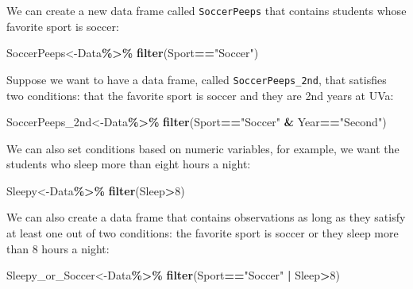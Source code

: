 \documentclass[
]{book}
\newenvironment{Shaded}{\begin{snugshade}}{\end{snugshade}}
\newcommand{\DecValTok}[1]{\textcolor[rgb]{0.00,0.00,0.81}{#1}}
\newcommand{\FunctionTok}[1]{\textcolor[rgb]{0.13,0.29,0.53}{\textbf{#1}}}
\newcommand{\NormalTok}[1]{#1}
\newcommand{\OtherTok}[1]{\textcolor[rgb]{0.56,0.35,0.01}{#1}}
\newcommand{\SpecialCharTok}[1]{\textcolor[rgb]{0.81,0.36,0.00}{\textbf{#1}}}
\newcommand{\StringTok}[1]{\textcolor[rgb]{0.31,0.60,0.02}{#1}}
\begin{document}
We can create a new data frame called \texttt{SoccerPeeps} that contains students whose favorite sport is soccer:

\begin{Shaded}
\begin{Highlighting}[]
\NormalTok{SoccerPeeps}\OtherTok{\textless{}{-}}\NormalTok{Data}\SpecialCharTok{\%\textgreater{}\%}
  \FunctionTok{filter}\NormalTok{(Sport}\SpecialCharTok{==}\StringTok{"Soccer"}\NormalTok{)}
\end{Highlighting}
\end{Shaded}

Suppose we want to have a data frame, called \texttt{SoccerPeeps\_2nd}, that satisfies two conditions: that the favorite sport is soccer and they are 2nd years at UVa:

\begin{Shaded}
\begin{Highlighting}[]
\NormalTok{SoccerPeeps\_2nd}\OtherTok{\textless{}{-}}\NormalTok{Data}\SpecialCharTok{\%\textgreater{}\%}
  \FunctionTok{filter}\NormalTok{(Sport}\SpecialCharTok{==}\StringTok{"Soccer"} \SpecialCharTok{\&}\NormalTok{ Year}\SpecialCharTok{==}\StringTok{"Second"}\NormalTok{)}
\end{Highlighting}
\end{Shaded}

We can also set conditions based on numeric variables, for example, we want the students who sleep more than eight hours a night:

\begin{Shaded}
\begin{Highlighting}[]
\NormalTok{Sleepy}\OtherTok{\textless{}{-}}\NormalTok{Data}\SpecialCharTok{\%\textgreater{}\%}
  \FunctionTok{filter}\NormalTok{(Sleep}\SpecialCharTok{\textgreater{}}\DecValTok{8}\NormalTok{)}
\end{Highlighting}
\end{Shaded}

We can also create a data frame that contains observations as long as they satisfy at least one out of two conditions: the favorite sport is soccer or they sleep more than 8 hours a night:

\begin{Shaded}
\begin{Highlighting}[]
\NormalTok{Sleepy\_or\_Soccer}\OtherTok{\textless{}{-}}\NormalTok{Data}\SpecialCharTok{\%\textgreater{}\%}
  \FunctionTok{filter}\NormalTok{(Sport}\SpecialCharTok{==}\StringTok{"Soccer"} \SpecialCharTok{|}\NormalTok{ Sleep}\SpecialCharTok{\textgreater{}}\DecValTok{8}\NormalTok{)}
\end{Highlighting}
\end{Shaded}
\end{document}

